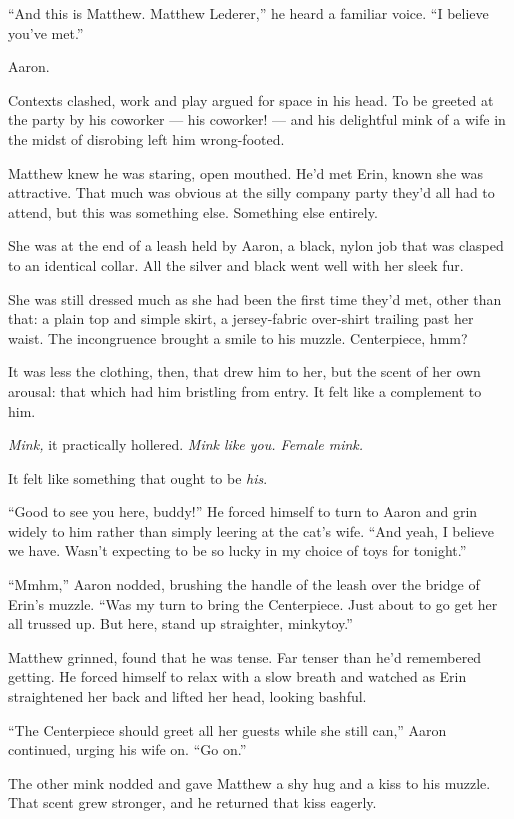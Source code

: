 ``And this is Matthew. Matthew Lederer,'' he heard a familiar voice. ``I
believe you've met.''

Aaron.

Contexts clashed, work and play argued for space in his head. To be
greeted at the party by his coworker --- his coworker! --- and his
delightful mink of a wife in the midst of disrobing left him
wrong-footed.

Matthew knew he was staring, open mouthed. He'd met Erin, known she was
attractive. That much was obvious at the silly company party they'd all
had to attend, but this was something else. Something else entirely.

She was at the end of a leash held by Aaron, a black, nylon job that was
clasped to an identical collar. All the silver and black went well with
her sleek fur.

She was still dressed much as she had been the first time they'd met,
other than that: a plain top and simple skirt, a jersey-fabric
over-shirt trailing past her waist. The incongruence brought a smile to
his muzzle. Centerpiece, hmm?

It was less the clothing, then, that drew him to her, but the scent of
her own arousal: that which had him bristling from entry. It felt like a
complement to him.

\emph{Mink,} it practically hollered. \emph{Mink like you. Female mink.}

It felt like something that ought to be \emph{his}.

``Good to see you here, buddy!'' He forced himself to turn to Aaron and
grin widely to him rather than simply leering at the cat's wife. ``And
yeah, I believe we have. Wasn't expecting to be so lucky in my choice of
toys for tonight.''

``Mmhm,'' Aaron nodded, brushing the handle of the leash over the bridge
of Erin's muzzle. ``Was my turn to bring the Centerpiece. Just about to
go get her all trussed up. But here, stand up straighter, minkytoy.''

Matthew grinned, found that he was tense. Far tenser than he'd
remembered getting. He forced himself to relax with a slow breath and
watched as Erin straightened her back and lifted her head, looking
bashful.

``The Centerpiece should greet all her guests while she still can,''
Aaron continued, urging his wife on. ``Go on.''

The other mink nodded and gave Matthew a shy hug and a kiss to his
muzzle. That scent grew stronger, and he returned that kiss eagerly.

